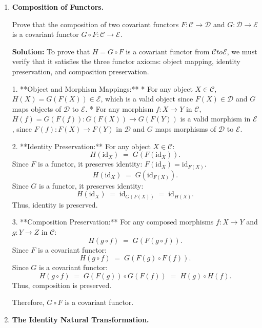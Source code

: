 \documentclass[12pt, a4paper]{article}
\begin{document}
\begin{enumerate}[label=\textbf{E\arabic*.}]
  \item \textbf{Composition of Functors.}
  
        Prove that the composition of two covariant functors $F: \mathcal{C} \to \mathcal{D}$ and $G: \mathcal{D} \to \mathcal{E}$ is a covariant functor $G \circ F: \mathcal{C} \to \mathcal{E}$.
        
        \textbf{Solution:}
        To prove that $H = G \circ F$ is a covariant functor from $\mathcal{C} to \mathcal{E}$, we must verify that it satisfies the three functor axioms: object mapping, identity preservation, and composition preservation.
        
        1. **Object and Morphism Mappings:**
           * For any object $X \in \mathcal{C}$, $H(X) = G(F(X)) \in \mathcal{E}$, which is a valid object since $F(X) \in \mathcal{D}$ and $G$ maps objects of $\mathcal{D}$ to $\mathcal{E}$.
           * For any morphism $f: X \to Y$ in $\mathcal{C}$, $H(f) = G(F(f)): G(F(X)) \to G(F(Y))$ is a valid morphism in $\mathcal{E}$, since $F(f): F(X) \to F(Y)$ in $\mathcal{D}$ and $G$ maps morphisms of $\mathcal{D}$ to $\mathcal{E}$.
        
        2. **Identity Preservation:**
           For any object $X \in \mathcal{C}$:
           \[
             H(\text{id}_X) \;=\; G(F(\text{id}_X)).
           \]
           Since $F$ is a functor, it preserves identity: $F(\text{id}_X) = \text{id}_{F(X)}$.
           \[
             H(\text{id}_X) \;=\; G(\text{id}_{F(X)}).
           \]
           Since $G$ is a functor, it preserves identity:
           \[
             H(\text{id}_X) \;=\; \text{id}_{G(F(X))} \;=\; \text{id}_{H(X)}.
           \]
           Thus, identity is preserved.
        
        3. **Composition Preservation:**
           For any composed morphisms $f: X \to Y$ and $g: Y \to Z$ in $\mathcal{C}$:
           \[
             H(g \circ f) \;=\; G(F(g \circ f)).
           \]
           Since $F$ is a covariant functor:
           \[
             H(g \circ f) \;=\; G(F(g) \circ F(f)).
           \]
           Since $G$ is a covariant functor:
           \[
             H(g \circ f) \;=\; G(F(g)) \circ G(F(f)) \;=\; H(g) \circ H(f).
           \]
           Thus, composition is preserved.
        
        Therefore, $G \circ F$ is a covariant functor.
        
  \item \textbf{The Identity Natural Transformation.}
  

\end{enumerate}
\end{document}
